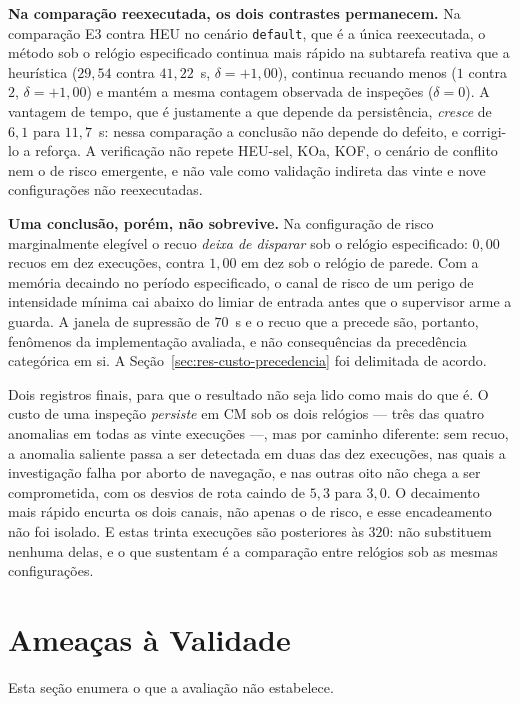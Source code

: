 \textbf{Na comparação reexecutada, os dois contrastes permanecem.} Na comparação E3
contra HEU no cenário \texttt{default}, que é a única reexecutada, o método sob o relógio
especificado continua mais rápido na subtarefa reativa que a heurística ($29{,}54$ contra
$41{,}22$~s, $\delta=+1{,}00$), continua recuando menos ($1$ contra $2$,
$\delta=+1{,}00$) e mantém a mesma contagem observada de inspeções ($\delta=0$). A
vantagem de tempo, que é justamente a que depende da persistência, \emph{cresce} de
$6{,}1$ para $11{,}7$~s: nessa comparação a conclusão não depende do defeito, e
corrigi-lo a reforça. A verificação não repete HEU-sel, KOa, KOF, o cenário de conflito
nem o de risco emergente, e não vale como validação indireta das vinte e nove
configurações não reexecutadas.

\textbf{Uma conclusão, porém, não sobrevive.} Na configuração de risco marginalmente
elegível o recuo \emph{deixa de disparar} sob o relógio especificado: $0{,}00$ recuos
em dez execuções, contra $1{,}00$ em dez sob o relógio de parede. Com a memória decaindo
no período especificado, o canal de risco de um perigo de intensidade mínima cai abaixo
do limiar de entrada antes que o supervisor arme a guarda. A janela de supressão de
$70$~s e o recuo que a precede são, portanto, fenômenos da implementação avaliada, e não
consequências da precedência categórica em si. A Seção~\ref{sec:res-custo-precedencia}
foi delimitada de acordo.

Dois registros finais, para que o resultado não seja lido como mais do que é. O custo de
uma inspeção \emph{persiste} em CM sob os dois relógios --- três das quatro anomalias em
todas as vinte execuções ---, mas por caminho diferente: sem recuo, a anomalia saliente
passa a ser detectada em duas das dez execuções, nas quais a investigação falha por
aborto de navegação, e nas outras oito não chega a ser comprometida, com os desvios de
rota caindo de $5{,}3$ para $3{,}0$. O decaimento mais rápido encurta os dois canais, não
apenas o de risco, e esse encadeamento não foi isolado. E estas trinta execuções são
posteriores às $320$: não substituem nenhuma delas, e o que sustentam é a comparação
entre relógios sob as mesmas configurações.

\section{Ameaças à Validade}
\label{sec:res-ameacas}

Esta seção enumera o que a avaliação não estabelece.

